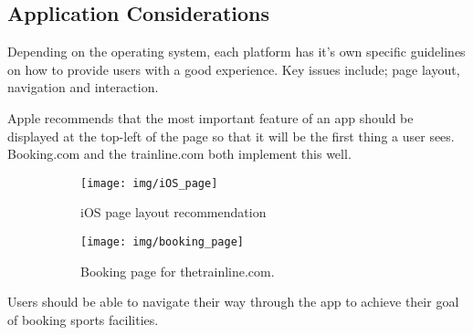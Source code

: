 \subsection{Application Considerations}
\label{sub:application_considerations}

Depending on the operating system, each platform has it's own specific
guidelines on how to provide users with a good experience. Key issues include;
page layout, navigation and interaction.

Apple recommends that the most important feature of an app should be displayed
at the top-left of the page so that it will be the first thing a user
sees\cite{HIGApple2013}.  Booking.com and the trainline.com both implement this
well\cite{BookingcomIOS}.
\begin{figure}[ht]
	\centering
	\begin{subfigure}[b]{0.5\textwidth}
		\texttt{[image: img/iOS\_page]}
		\caption{iOS page layout recommendation}\label{fig:iOS_page}
	\end{subfigure}%
	\qquad
	\begin{subfigure}[b]{0.25\textwidth}
		\texttt{[image: img/booking\_page]}
		\caption{Booking page for thetrainline.com\cite{thetrainlineIOS}. }
	\end{subfigure}
	\caption{}\label{fig:booking_page}
\end{figure}

Users should be able to navigate their way through the app to achieve their
goal of booking sports facilities.

